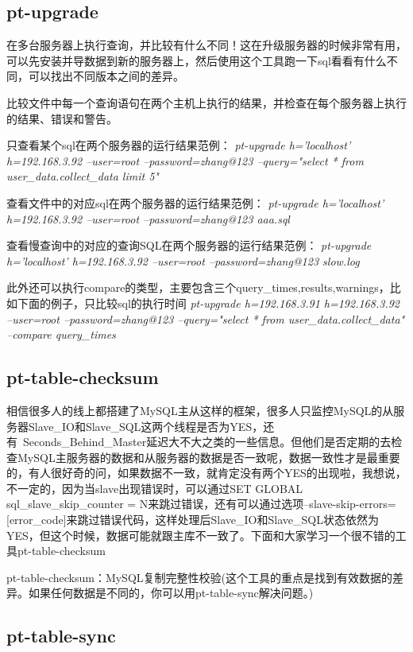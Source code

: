 \subsection{pt-upgrade}

在多台服务器上执行查询，并比较有什么不同！这在升级服务器的时候非常有用，可以先安装并导数据到新的服务器上，然后使用这个工具跑一下sql看看有什么不同，可以找出不同版本之间的差异。

比较文件中每一个查询语句在两个主机上执行的结果，并检查在每个服务器上执行的结果、错误和警告。

只查看某个sql在两个服务器的运行结果范例：
\textit{pt-upgrade h='localhost' h=192.168.3.92 --user=root --password=zhang@123 --query="select * from user_data.collect_data limit 5"}

查看文件中的对应sql在两个服务器的运行结果范例：
\textit{pt-upgrade h='localhost' h=192.168.3.92 --user=root --password=zhang@123  aaa.sql}

查看慢查询中的对应的查询SQL在两个服务器的运行结果范例：
\textit{pt-upgrade h='localhost' h=192.168.3.92 --user=root --password=zhang@123  slow.log}

此外还可以执行compare的类型，主要包含三个query_times,results,warnings，比如下面的例子，只比较sql的执行时间
\textit{pt-upgrade h=192.168.3.91 h=192.168.3.92 --user=root --password=zhang@123 --query="select * from user_data.collect_data" --compare query_times}

\subsection{pt-table-checksum}
相信很多人的线上都搭建了MySQL主从这样的框架，很多人只监控MySQL的从服务器Slave_IO和Slave_SQL这两个线程是否为YES，还有 Seconds_Behind_Master延迟大不大之类的一些信息。但他们是否定期的去检查MySQL主服务器的数据和从服务器的数据是否一致呢，数据一致性才是最重要的，有人很好奇的问，如果数据不一致，就肯定没有两个YES的出现啦，我想说，不一定的，因为当slave出现错误时，可以通过SET GLOBAL sql_slave_skip_counter = N来跳过错误，还有可以通过选项--slave-skip-errors=[error_code]来跳过错误代码，这样处理后Slave_IO和Slave_SQL状态依然为YES，但这个时候，数据可能就跟主库不一致了。下面和大家学习一个很不错的工具pt-table-checksum

pt-table-checksum：MySQL复制完整性校验(这个工具的重点是找到有效数据的差异。如果任何数据是不同的，你可以用pt-table-sync解决问题。)


\subsection{pt-table-sync}

